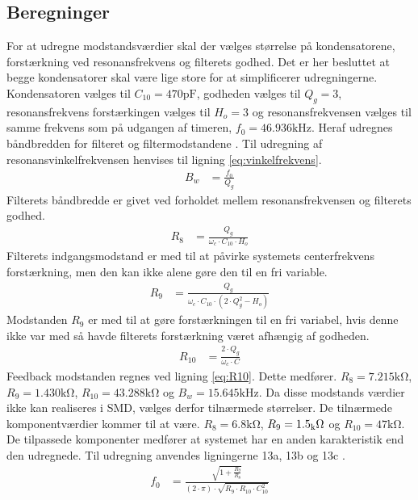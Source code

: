 \subsection{Beregninger}
For at udregne modstandsværdier skal der vælges størrelse på kondensatorene, forstærkning ved resonansfrekvens og filterets godhed.
Det er her besluttet at begge kondensatorer skal være lige store for at simplificerer udregningerne.
Kondensatoren vælges til $C_{10} = 470 \si{\pico\farad}$, godheden vælges til $Q_g = 3$, resonansfrekvens forstærkingen vælges til $H_o = 3$ og resonansfrekvensen vælges til samme frekvens som på udgangen af timeren, $f_0 = 46.936 \si{\kilo\hertz}$.
Heraf udregnes båndbredden for filteret og filtermodstandene \cite[Side. 209]{Huelsman1993}.
Til udregning af resonansvinkelfrekvensen henvises til ligning \ref{eq:vinkelfrekvens}.
\begin{align}
	B_w & = \frac{f_0}{Q_g}
	\end{align}
Filterets båndbredde er givet ved forholdet mellem resonansfrekvensen og filterets godhed.
\begin{align}
	R_8 & = \frac{Q_g}{\omega_c \cdot C_{10} \cdot H_o } \label{eq:R8}
	\end{align}
Filterets indgangsmodstand er med til at påvirke systemets centerfrekvens forstærkning, men den kan ikke alene gøre den til en fri variable. 
\begin{align}
	R_9 & = \frac{Q_g}{ \omega_c \cdot C_{10} \cdot \left( 2 \cdot Q_g^2 - H_o \right) } \label{eq:R9}
	\end{align}
Modstanden $R_9$ er med til at gøre forstærkningen til en fri variabel, hvis denne ikke var med så havde filterets forstærkning været afhængig af godheden.
\begin{align}
	R_{10} & = \frac{2 \cdot Q_g}{ \omega_c \cdot C} \label{eq:R10}
\end{align}
Feedback modstanden regnes ved ligning \ref{eq:R10}.
Dette medfører. $R_8 = 7.215 \si{\kilo\ohm}$, $R_9 = 1.430 \si{\kilo\ohm}$, $R_{10} = 43.288 \si{\kilo\ohm}$ og $B_w = 15.645 \si{\kilo\hertz}$.
Da disse modstands værdier ikke kan realiseres i SMD, vælges derfor tilnærmede størrelser.
De tilnærmede komponentværdier kommer til at være. $R_8 = 6.8 \si{\kilo\ohm}$, $R_9 = 1.5 \si{_\kilo\ohm}$ og $R_{10} = 47 \si{\kilo\ohm}$.
De tilpassede komponenter medfører at systemet har en anden karakteristik end den udregnede. 
Til udregning anvendes ligningerne 13a, 13b og 13c \cite[Side. 208]{Huelsman1993}. 
\begin{align}
	f_0 & = \frac{\sqrt{1+\frac{R_9}{R_8}}}{\left( 2 \cdot \pi \right) \cdot \sqrt{R_9 \cdot R_{10} \cdot C_{10}^2}}
	\end{align}
